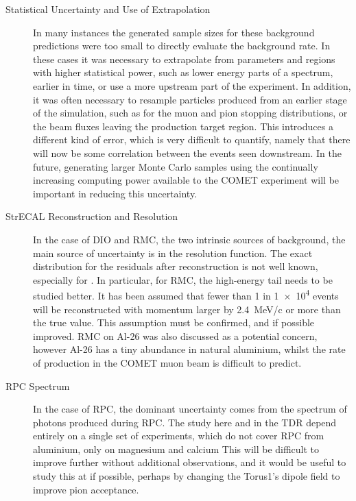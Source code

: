 \begin{description}
\item[Statistical Uncertainty and Use of Extrapolation]
In many instances the generated sample sizes for these background predictions were too small to directly evaluate the background rate.
In these cases it was necessary to extrapolate from parameters and regions with higher statistical power, such as lower energy parts of a spectrum, earlier in time, or use a more upstream part of the experiment.
In addition, it was often necessary to resample particles produced from an earlier stage of the simulation, such as for the muon and pion stopping distributions, or the beam fluxes leaving the production target region.
This introduces a different kind of error, which is very difficult to quantify, namely that there will now be some correlation between the events seen downstream.
In the future, generating larger Monte Carlo samples using the continually increasing computing power available to the COMET experiment will be important in reducing this uncertainty.

\item[StrECAL Reconstruction and Resolution]
In the case of \ac{DIO} and \ac{RMC}, the two intrinsic sources of background, the main source of uncertainty is in the resolution function.
The exact distribution for the residuals after reconstruction is not well known, especially for \phaseII.
In particular, for \ac{RMC}, the high-energy tail needs to be studied better. 
It has been assumed that fewer than 1 in \num{1e4} events will be reconstructed with momentum larger by 2.4~MeV/c or more than the true value.
This assumption must be confirmed, and if possible improved.
RMC on Al-26 was also discussed as a potential concern, however Al-26 has a tiny abundance in natural aluminium, whilst the rate of production in the COMET muon beam is difficult to predict.

\item[RPC Spectrum]
In the case of \acf{RPC}, the dominant uncertainty comes from the spectrum of photons produced during RPC.
The study here and in the \phaseI TDR depend entirely on a single set of experiments, which do not cover RPC from aluminium, only on magnesium and calcium
This will be difficult to improve further without additional observations, and it would be useful to study this at \phaseI if possible, perhaps by changing the Torus1's dipole field to improve pion acceptance.


\end{description}
